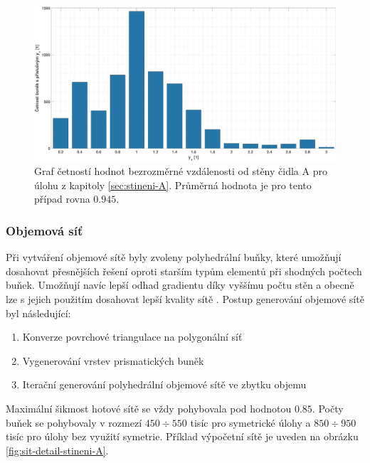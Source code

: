             \begin{figure}[ht!]
                \centering
                \includegraphics*[width=\textwidth  ]{300_VYPOCETNI_MODEL/yplus-stineni-A.eps}
                \caption{Graf četností hodnot bezrozměrné vzdálenosti od stěny čidla A pro úlohu z kapitoly \ref{sec:stineni-A}. Průměrná hodnota je pro tento případ rovna $0.945$.}
                \label{fig:yplus-stineni-A}
            \end{figure}

            \newpage


        \subsubsection{Objemová síť}

        Při vytváření objemové sítě byly zvoleny polyhedrální buňky, které umožňují dosahovat přesnějších řešení oproti starším typům elementů při shodných počtech buňek. Umožňují navíc lepší odhad gradientu díky vyššímu počtu stěn a obecně lze s jejich použitím dosahovat lepší kvality sítě \cite{Sosnowski2018}. Postup generování objemové sítě byl následující:

        \begin{enumerate}
            \item Konverze povrchové triangulace na polygonální síť
            \item Vygenerování vrstev prismatických buněk
            \item Iterační generování polyhedrální objemové sítě ve zbytku objemu
        \end{enumerate}

        Maximální šikmost hotové sítě se vždy pohybovala pod hodnotou $0.85$. Počty buňek se pohybovaly v rozmezí $450 \div 550$ tisíc pro symetrické úlohy a $850 \div 950$ tisíc pro úlohy bez využití symetrie. Příklad výpočetní sítě je uveden na obrázku \ref{fig:sit-detail-stineni-A}.


